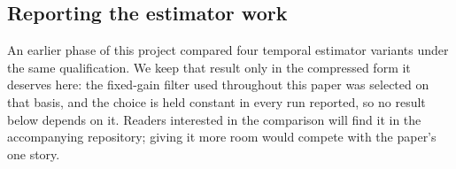 \subsection{Reporting the estimator work}

An earlier phase of this project compared four temporal estimator
variants under the same qualification. We keep that result only in the
compressed form it deserves here: the fixed-gain filter used throughout
this paper was selected on that basis, and the choice is held constant
in every run reported, so no result below depends on it. Readers
interested in the comparison will find it in the accompanying
repository; giving it more room would compete with the paper's one
story.
